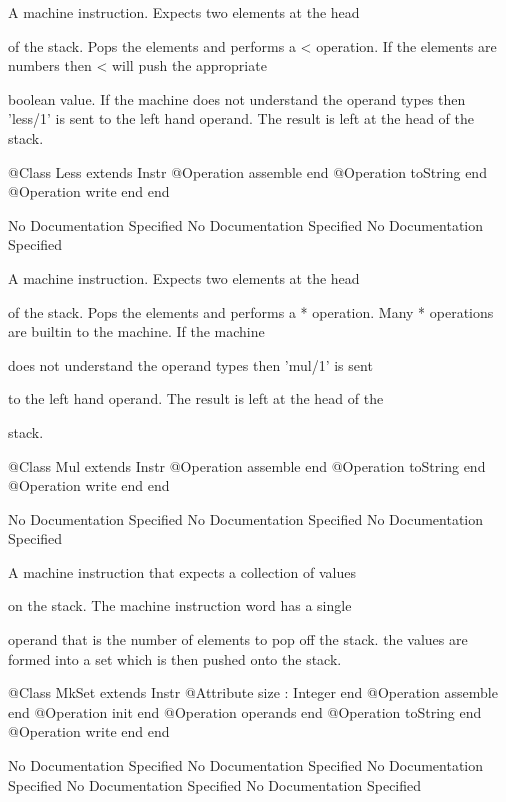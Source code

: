        A machine instruction. Expects two elements at the head

       of the stack. Pops the elements and performs a < operation.
       If the elements are numbers then < will push the appropriate

       boolean value. If the machine does not understand the operand 
       types then 'less/1' is sent to the left hand operand. The result 
       is left at the head of the stack.
\begin{Interface}
@Class Less extends Instr
  @Operation assemble end
  @Operation toString end
  @Operation write end
end
\end{Interface}
No Documentation Specified
No Documentation Specified
No Documentation Specified

       A machine instruction. Expects two elements at the head

       of the stack. Pops the elements and performs a * operation.
       Many * operations are builtin to the machine. If the machine

       does not understand the operand types then 'mul/1' is sent

       to the left hand operand. The result is left at the head of the

       stack.
\begin{Interface}
@Class Mul extends Instr
  @Operation assemble end
  @Operation toString end
  @Operation write end
end
\end{Interface}
No Documentation Specified
No Documentation Specified
No Documentation Specified

      A machine instruction that expects a collection of values

      on the stack. The machine instruction word has a single

      operand that is the number of elements to pop off the stack.
      the values are formed into a set which is then pushed onto 
      the stack.
\begin{Interface}
@Class MkSet extends Instr
  @Attribute size : Integer end
  @Operation assemble end
  @Operation init end
  @Operation operands end
  @Operation toString end
  @Operation write end
end
\end{Interface}
No Documentation Specified
No Documentation Specified
No Documentation Specified
No Documentation Specified
No Documentation Specified

